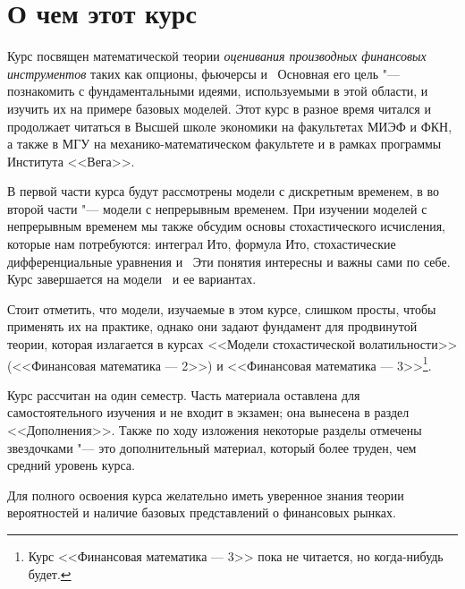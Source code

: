 \chapter*{О чем этот курс}

Курс посвящен математической теории \emph{оценивания производных финансовых инструментов} таких как опционы, фьючерсы и \tp\ 
Основная его цель "--- познакомить с фундаментальными идеями, используемыми в этой области, и изучить их на примере базовых моделей.
Этот курс в разное время читался и продолжает читаться в Высшей школе экономики на факультетах МИЭФ и ФКН, а также в МГУ на механико-математическом факультете и в рамках программы Института <<Вега>>. 

В первой части курса будут рассмотрены модели с дискретным временем, в во второй части "--- модели с непрерывным временем.
При изучении моделей с непрерывным временем мы также обсудим основы стохастического исчисления, которые нам потребуются: интеграл Ито, формула Ито, стохастические дифференциальные уравнения и \tp\ 
Эти понятия интересны и важны сами по себе.
Курс завершается на модели \bs\ и ее вариантах.

Стоит отметить, что модели, изучаемые в этом курсе, слишком просты, чтобы применять их на практике, однако они задают фундамент для продвинутой теории, которая излагается в курсах <<Модели стохастической волатильности>> (<<Финансовая математика --- 2>>) и <<Финансовая математика --- 3>>\footnote{Курс <<Финансовая математика --- 3>> пока не читается, но когда-нибудь будет.}.

Курс рассчитан на один семестр. Часть материала оставлена для самостоятельного изучения и не входит в экзамен; она вынесена в раздел <<Дополнения>>.
Также по ходу изложения некоторые разделы отмечены звездочками "--- это дополнительный материал, который более труден, чем средний уровень курса.


Для полного освоения курса желательно иметь уверенное знания теории вероятностей и наличие  базовых представлений о финансовых рынках.
